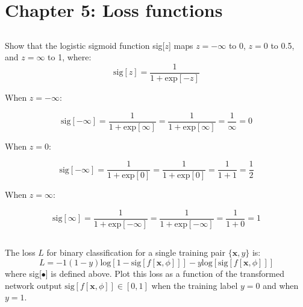 \documentclass[12pt]{report}
\begin{document}
\section*{Chapter 5: Loss functions}

\subsection{}
\begin{mdframed}
    Show that the logistic sigmoid function sig[$z$] maps $z = -\infty$ to 0, $z=0$ to 0.5, and $z = \infty$ to 1, where:
    \begin{equation*}
        \text{sig}[z] = \frac{1}{1+\text{exp}[-z]}
    \end{equation*}
\end{mdframed}

When $z = -\infty$:

\begin{equation*}
    \text{sig}[-\infty] = \frac{1}{1+\text{exp}[\infty]} = \frac{1}{1+\text{exp}[\infty]} = \frac{1}{\infty} = 0
\end{equation*}

When $z=0$:

\begin{equation*}
    \text{sig}[-\infty] = \frac{1}{1+\text{exp}[0]} = \frac{1}{1+\text{exp}[0]} = \frac{1}{1 + 1} = \frac{1}{2}
\end{equation*}

When $z=\infty$:

\begin{equation*}
    \text{sig}[\infty] = \frac{1}{1+\text{exp}[-\infty]} = \frac{1}{1+\text{exp}[-\infty]} = \frac{1}{1+0} = 1
\end{equation*}



\subsection{}
\begin{mdframed}
    The loss $L$ for binary classification for a single training pair $\{\mathbf{x},y\}$ is:
    \begin{equation*}
        L = -1(1-y) \text{log}\left[1- \text{sig}[f[\mathbf{x}, \phi]]\right] -y\text{log}\left[\text{sig}[f[\mathbf{x}, \phi]]\right]
    \end{equation*}
    where sig[$\bullet$] is defined above. Plot this loss as a function of the transformed network output $\text{sig}[f[\mathbf{x},\phi]] \in [0,1]$ when the training label $y=0$ and when $y=1$.
\end{mdframed}
\end{document}
